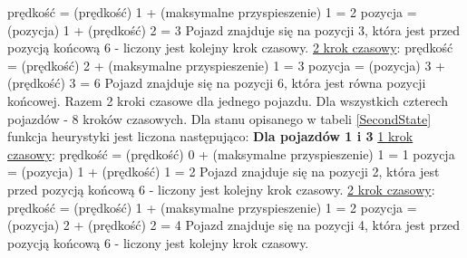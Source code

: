 \newline
prędkość = (prędkość) 1 + (maksymalne przyspieszenie) 1 = 2
\newline
pozycja = (pozycja) 1 + (prędkość) 2 = 3
\newline
\newline
Pojazd znajduje się na pozycji 3, która jest przed pozycją końcową 6 - liczony jest kolejny krok czasowy.
\newline
\newline
\underline{2 krok czasowy}:
\newline
\newline
prędkość = (prędkość) 2 + (maksymalne przyspieszenie) 1 = 3
\newline
pozycja = (pozycja) 3 + (prędkość) 3 = 6
\newline
\newline
Pojazd znajduje się na pozycji 6, która jest równa pozycji końcowej.
\newline
\newline
Razem 2 kroki czasowe dla jednego pojazdu. Dla wszystkich czterech pojazdów - 8 kroków czasowych.
\newline
\newline
\newline
Dla stanu opisanego w tabeli \ref{SecondState} funkcja heurystyki jest liczona następująco:
\newline
\newline
\textbf{Dla pojazdów 1 i 3}
\newline
\newline
\underline{1 krok czasowy}:
\newline
\newline
prędkość = (prędkość) 0 + (maksymalne przyspieszenie) 1 = 1
\newline
pozycja = (pozycja) 1 + (prędkość) 1 = 2
\newline
\newline
Pojazd znajduje się na pozycji 2, która jest przed pozycją końcową 6 - liczony jest kolejny krok czasowy.
\newline
\newline
\underline{2 krok czasowy}:
\newline
\newline
prędkość = (prędkość) 1 + (maksymalne przyspieszenie) 1 = 2
\newline
pozycja = (pozycja) 2 + (prędkość) 2 = 4
\newline
\newline
Pojazd znajduje się na pozycji 4, która jest przed pozycją końcową 6 - liczony jest kolejny krok czasowy.
